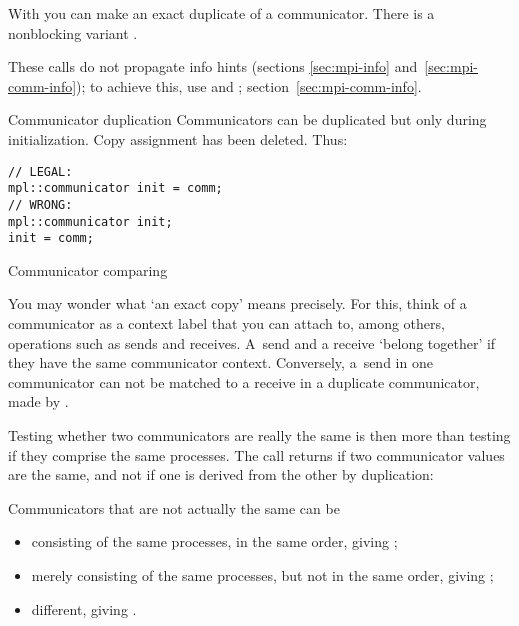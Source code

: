 
With  you can make an exact duplicate of a communicator.
There is a nonblocking variant .

These calls do not propagate info hints
(sections \ref{sec:mpi-info} and~\ref{sec:mpi-comm-info});
to achieve this,
use  and ;
section~\ref{sec:mpi-comm-info}.

\begin{mplnote}{Communicator duplication}
  Communicators can be duplicated but only during initialization.
  Copy assignment has been deleted. Thus:
\begin{lstlisting}
// LEGAL: 
mpl::communicator init = comm;
// WRONG:
mpl::communicator init;
init = comm;
\end{lstlisting}
\end{mplnote}

 {Communicator comparing}
\label{sec:comm-compare}

You may wonder what `an exact copy' means precisely.
For this, think of a communicator as a context label that you can attach to,
among others, operations such as sends and receives.
A~send and a receive `belong together' if they have the same communicator context.
Conversely, a~send in one communicator can not be matched
to a receive in a duplicate communicator, made by .

Testing whether two communicators are really the same
is then more than testing if they comprise the same processes.
The call  returns 
if two communicator values are the same,
and not if one is derived from the other by duplication:
%

Communicators that are not actually the same can be
\begin{itemize}
\item consisting of the same processes, in the same order,
  giving ;
\item merely consisting of the same processes, but not in the same order,
  giving ;
\item different, giving .
\end{itemize}

